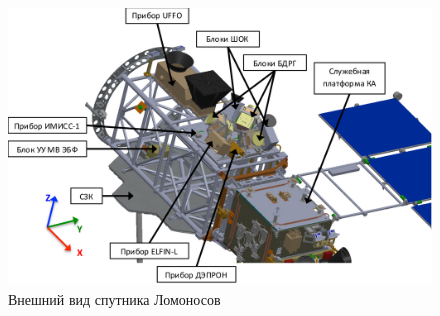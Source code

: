
\begin{figure}
\centering
\includegraphics[width=0.9\linewidth]{images/lomo3}
\caption{Внешний вид спутника Ломоносов}
\label{fig:lomo3}
\end{figure}


